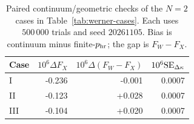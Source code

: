 \begin{table}[tbp]
\caption{\label{tab:new-continuum-validation}Paired continuum/geometric checks of the $N=2$ cases in Table~\ref{tab:werner-cases}. Each uses $500\,000$ trials and seed $20261105$. Bias is continuum minus finite-$p_{\rm hr}$; the gap is $F_W-F_X$.}
\begin{ruledtabular}
\begin{tabular}{lrrr}
Case & $10^6\Delta F_X$ & $10^6\Delta(F_W-F_X)$ & $10^6{\rm SE}_{\Delta\kappa}$\\
\hline
I & -0.236 & -0.001 & 0.0007\\
II & -0.123 & +0.028 & 0.0007\\
III & -0.104 & +0.020 & 0.0007\\
\end{tabular}
\end{ruledtabular}
\end{table}
